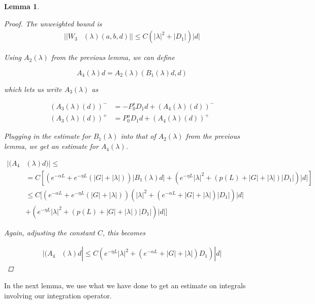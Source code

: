 \documentclass[12pt]{article}
\newtheorem{lemma}{Lemma}
\begin{document}
\begin{lemma}
\begin{proof}
The unweighted bound is
\begin{align*}
||W_3&(\lambda)(a,b,d)|| \leq C \left( |\lambda|^2 + |D_1|\right)|d|
\end{align*} 


Using $A_2(\lambda)$ from the previous lemma, we can define

\[
A_4(\lambda)d = A_2(\lambda)(B_1(\lambda)d,d)
\]

which lets us write $A_3(\lambda)$ as 

\begin{align*}
(A_3(\lambda)(d))^- &= -P_0^s D_1 d + (A_4(\lambda)(d))^-\\
(A_3(\lambda)(d))^+ &= P_0^u D_1 d + (A_4(\lambda)(d))^+
\end{align*}

Plugging in the estimate for $B_1(\lambda)$ into that of $A_2(\lambda)$ from the previous lemma, we get an estimate for $A_4(\lambda)$.

\begin{align*}
|(A_4&(\lambda)d)| \leq \\
&= C \left[ \left( e^{-\alpha L} + e^{-\eta L} \left(|G| + |\lambda|\right)\right) |B_1(\lambda)d|
+ \left( e^{-\eta L} |\lambda|^2 + \left( p(L) + |G| + |\lambda| \right)|D_1| \right)|d| \right]\\
&\leq C [ \left( e^{-\alpha L} + e^{-\eta L} \left(|G| + |\lambda|\right)\right) (|\lambda|^2 + (e^{-\alpha L} + |G| + |\lambda|)|D_1| )|d|\\
&+ \left( e^{-\eta L} |\lambda|^2 + \left( p(L) + |G| + |\lambda| \right)|D_1| \right)|d| ]
\end{align*}

Again, adjusting the constant $C$, this becomes

\begin{align*}
|(A_4&(\lambda)d| \leq C ( e^{-\eta L}|\lambda|^2 + (e^{-\alpha L} + |G| + |\lambda|)D_1)|d|
\end{align*}

\end{proof}
\end{lemma}

In the next lemma, we use what we have done to get an estimate on integrals involving our integration operator.
\end{document}
